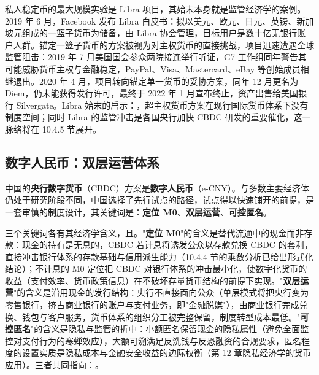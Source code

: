 私人稳定币的最大规模实验是 Libra 项目，其始末本身就是监管经济学的案例。2019 年 6 月，Facebook 发布 Libra 白皮书：拟以美元、欧元、日元、英镑、新加坡元组成的一篮子货币为储备，由 Libra 协会管理，目标用户是数十亿无银行账户人群。锚定一篮子货币的方案被视为对主权货币的直接挑战，项目迅速遭遇全球监管阻击：2019 年 7 月美国国会参众两院接连举行听证，G7 工作组同年警告其可能威胁货币主权与金融稳定，PayPal、Visa、Mastercard、eBay 等创始成员相继退出。2020 年 4 月，项目转向锚定单一货币的妥协方案，同年 12 月更名为 Diem，仍未能获得发行许可，最终于 2022 年 1 月宣布终止，资产出售给美国银行 Silvergate。Libra 始末的启示：，超主权货币方案在现行国际货币体系下没有制度空间；同时 Libra 的监管冲击是各国央行加快 CBDC 研发的重要催化，这一脉络将在 10.4.5 节展开。

\subsection{数字人民币：双层运营体系}

中国的\textbf{央行数字货币}（CBDC）方案是\textbf{数字人民币}（e-CNY）。与多数主要经济体仍处于研究阶段不同，中国选择了先行试点的路径，试点得以快速铺开的前提，是一套审慎的制度设计，其关键词是：\textbf{定位 M0}、\textbf{双层运营}、\textbf{可控匿名}。

三个关键词各有其经济学含义，且。"\textbf{定位 M0}"的含义是替代流通中的现金而非存款：现金的持有是无息的，CBDC 若计息将诱发公众以存款兑换 CBDC 的套利，直接冲击银行体系的存款基础与信用派生能力（10.4.4 节的乘数分析已给出形式化结论）；不计息的 M0 定位把 CBDC 对银行体系的冲击最小化，使数字化货币的收益（支付效率、货币政策信息）在不破坏存量货币结构的前提下实现。"\textbf{双层运营}"的含义是沿用现金的发行结构：央行不直接面向公众（单层模式将把央行变为零售银行，挤占商业银行的账户与支付业务，即"金融脱媒"），由商业银行完成兑换、钱包与客户服务，货币体系的组织分工被完整保留，制度转型成本最低。"\textbf{可控匿名}"的含义是隐私与监管的折中：小额匿名保留现金的隐私属性（避免全面监控对支付行为的寒蝉效应），大额可溯满足反洗钱与反恐融资的合规要求，匿名程度的设置实质是隐私成本与金融安全收益的边际权衡（第 12 章隐私经济学的货币应用）。三者共同指向：。

